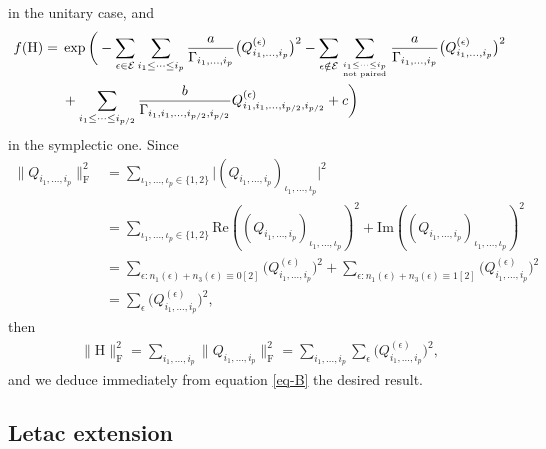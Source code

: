 \documentclass[pdftex]{sigma}
\numberwithin{equation}{section}
\theoremstyle{definition}
\begin{document}
in the unitary case, and
\begin{align}
    f(\mathrm{H}) ={}& \exp \bigg( -\sum_{\epsilon \in \mathcal{E}} \sum_{i_1\leq\dots\leq i_p} \frac{a}{\Gamma_{i_1,\dots,i_p}} \bigl(Q^{(\epsilon)}_{i_{1},\dots,i_p}\bigr)^2 -  \sum_{\epsilon \notin \mathcal{E}} \sum_{\genfrac{}{}{0pt}{}{i_1\leq \dots \leq i_p }{\text{not paired}} } \frac{a}{\Gamma_{i_1,\dots,i_p}} \bigl(Q^{(\epsilon)}_{i_{1},\dots,i_p}\bigr)^2 \nonumber\\
    &  + \sum_{i_1 \leq\dots \leq i_{p/2}} \frac{b}{\Gamma_{i_1,i_1,\dots,i_{p/2},i_{p/2}}} Q^{(\epsilon)}_{i_1,i_1,\dots,i_{p/2},i_{p/2}} +c \bigg) \label{eq-B}
\end{align}
in the symplectic one. Since
\begin{align*}
    \| Q_{i_1,\dots,i_p} \|^2_{\mathrm{F}} &= \sum_{\iota_1,\dots,\iota_p \in \{1,2\} } \vert(Q_{i_1,\dots,i_p})_{\iota_1,\dots,\iota_p}\vert^2
    \\
    &= \sum_{\iota_1,\dots,\iota_p \in \{1,2\} } \mathrm{Re}((Q_{i_1,\dots,i_p})_{\iota_1,\dots,\iota_p})^2 + \mathrm{Im}((Q_{i_1,\dots,i_p})_{\iota_1,\dots,\iota_p})^2
    \\
    &= \sum_{\epsilon: n_1(\epsilon)+n_3(\epsilon) \equiv 0 [2] } \bigl(Q^{(\epsilon)}_{i_1,\dots,i_p}\bigr)^2 + \sum_{\epsilon: n_1(\epsilon)+n_3(\epsilon) \equiv 1 [2] } \bigl(Q^{(\epsilon)}_{i_1,\dots,i_p}\bigr)^2 \\
    &= \sum_{\epsilon} \bigl(Q^{(\epsilon)}_{i_1,\dots,i_p}\bigr)^2,
\end{align*}
then
\begin{align*}
    \| \mathrm{H} \|^2_{\mathrm{F}} = \sum_{i_1,\dots,i_p } \| Q_{i_1,\dots,i_p} \|^2_{\mathrm{F}} = \sum_{i_1,\dots,i_p } \sum_{\epsilon } \bigl(Q^{(\epsilon)}_{i_1,\dots,i_p}\bigr)^2,
\end{align*}
and we deduce immediately from equation \eqref{eq-B} the desired result.

\subsection{Letac extension}\label{sec:let}
\end{document}
